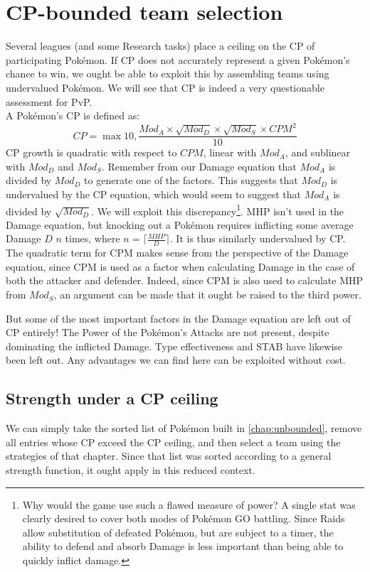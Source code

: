 \chapter{CP-bounded team selection}
\label{chap:bounded}
Several leagues (and some Research tasks) place a ceiling on the CP of
 participating Pokémon.
If CP does not accurately represent a given Pokémon's chance to win, we ought
 be able to exploit this by assembling teams using undervalued Pokémon.
We will see that CP is indeed a very questionable assessment for PvP.\\

\noindent{}A Pokémon's CP is defined as:
\[ CP = \max{10, \frac{Mod_A \times \sqrt{Mod_D} \times \sqrt{Mod_S} \times CPM^2}{10}} \]
\noindent{}CP growth is quadratic with respect to $CPM$, linear with $Mod_A$, and
  sublinear with $Mod_D$ and $Mod_S$.
Remember from our Damage equation that $Mod_A$ is divided by $Mod_D$
 to generate one of the factors.
This suggests that $Mod_D$ is undervalued by the CP equation, which
 would seem to suggest that $Mod_A$ is divided by $\sqrt{Mod_D}$.
We will exploit this discrepancy\footnote{Why would the game use such
 a flawed measure of power? A single stat was clearly desired to cover both
 modes of Pokémon GO battling. Since Raids allow substitution of defeated
 Pokémon, but are subject to a timer, the ability to defend and absorb
 Damage is less important than being able to quickly inflict damage.}.
MHP isn't used in the Damage equation, but knocking out a Pokémon
 requires inflicting some average Damage $D$ $n$ times,
 where $n = \lceil\frac{MHP}{D}\rceil$.
It is thus similarly undervalued by CP\@.
The quadratic term for CPM makes sense from the perspective of the Damage
 equation, since CPM is used as a factor when calculating Damage in the
 case of both the attacker and defender.
Indeed, since CPM is also used to calculate MHP from $Mod_S$, an argument
 can be made that it ought be raised to the third power.

But some of the most important factors in the Damage equation are left
out of CP entirely! The Power of the Pokémon's Attacks are not present,
despite dominating the inflicted Damage. Type effectiveness and STAB
have likewise been left out. Any advantages we can find here can be
exploited without cost.

\section{Strength under a CP ceiling}
We can simply take the sorted list of Pokémon built in
\autoref{chap:unbounded}, remove all entries whose CP exceed the CP ceiling,
and then select a team using the strategies of that chapter. Since
that list was sorted according to a general strength function, it
ought apply in this reduced context.

